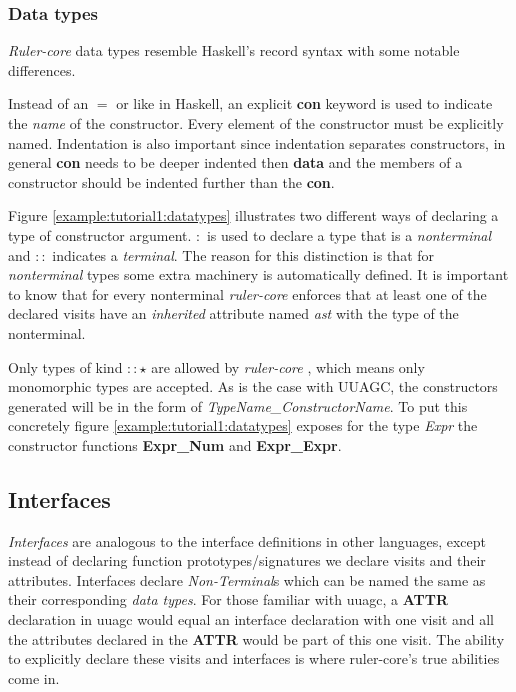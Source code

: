 \documentclass[twoside, titlepage, openright, a4paper]{book}
\newcommand{\rcore}{\emph{ruler-core }}
\newcommand{\Rcore}{\emph{Ruler-core }}
\begin{document}
\subsubsection{Data types}
\Rcore data types resemble Haskell's record syntax with some notable differences.

Instead of an $=$ or \textbar \space like in Haskell, an explicit \textbf{con} keyword is used to indicate the \emph{name} of the constructor. Every element of the constructor must be explicitly named. Indentation is also important since indentation separates constructors, in general \textbf{con} needs to be deeper indented then \textbf{data} and the members of a constructor should be indented further than the \textbf{con}. 

Figure \ref{example:tutorial1:datatypes} illustrates two different ways of declaring a type of constructor argument. $:$ is used to declare a type that is a \emph{nonterminal} and $::$ indicates a \emph{terminal}. The reason for this distinction is that for \emph{nonterminal} types some extra machinery is automatically defined. It is important to know that for every nonterminal \rcore enforces that at least one of the declared visits have an \emph{inherited} attribute named \emph{ast} with the type of the nonterminal.

Only types of kind $:: \star$ are allowed by \rcore, which means only monomorphic types are accepted. As is the case with UUAGC, the constructors generated will be in the form of \emph{TypeName\_ConstructorName}. To put this concretely figure \ref{example:tutorial1:datatypes} exposes for the type \emph{Expr} the constructor functions \textbf{Expr\_Num} and \textbf{Expr\_Expr}.

\subsection{Interfaces}
\emph{Interfaces} are analogous to the interface definitions in other languages, except instead of declaring function prototypes/signatures we declare visits and their attributes. Interfaces declare \emph{Non-Terminal}s which can be named the same as their corresponding \emph{data types}. For those familiar with uuagc, a \textbf{ATTR} declaration in uuagc would equal an interface declaration with one visit and all the attributes declared in the \textbf{ATTR} would be part of this one visit. The ability to explicitly declare these visits and interfaces is where ruler-core's true abilities come in.
\end{document}
